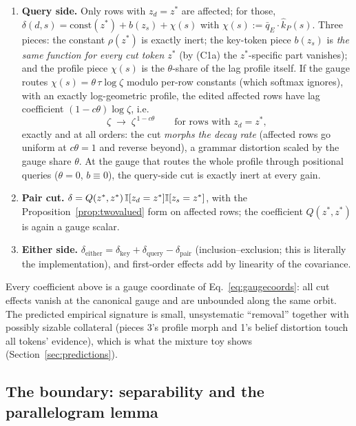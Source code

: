 \documentclass{article}
\begin{document}
\begin{theorem}
\begin{enumerate}
    \item \textbf{Query side.} Only rows with $z_d = z^*$ are affected; for those, $\delta(d,s) = \mathrm{const}(z^*) + b(z_s) + \chi(s)$ with $\chi(s) := \bar q_E\cdot\hat k_P(s)$. Three pieces: the constant $\rho(z^*)$ is exactly inert; the key-token piece $b(z_s)$ is \emph{the same function for every cut token $z^*$} (by (C1a) the $z^*$-specific part vanishes); and the profile piece $\chi(s)$ is the $\theta$-share of the lag profile itself. If the gauge routes $\chi(s) = \theta\,\tau\log\zeta$ modulo per-row constants (which softmax ignores), with an exactly log-geometric profile, the edited affected rows have lag coefficient $(1 - c\theta)\log\zeta$, i.e.
    \begin{equation}\label{eq:morph}
        \zeta \;\longrightarrow\; \zeta^{\,1 - c\theta} \qquad \text{for rows with } z_d = z^* ,
    \end{equation}
    exactly and at all orders: the cut \emph{morphs the decay rate} (affected rows go uniform at $c\theta = 1$ and reverse beyond), a grammar distortion scaled by the gauge share $\theta$. At the gauge that routes the whole profile through positional queries ($\theta = 0$, $b \equiv 0$), the query-side cut is exactly inert at every gain.
    \item \textbf{Pair cut.} $\delta = Q(z^*, z^*)\,\mathbb{I}[z_d = z^*]\mathbb{I}[z_s = z^*]$, with the Proposition~\ref{prop:twovalued} form on affected rows; the coefficient $Q(z^*, z^*)$ is again a gauge scalar.
    \item \textbf{Either side.} $\delta_{\mathrm{either}} = \delta_{\mathrm{key}} + \delta_{\mathrm{query}} - \delta_{\mathrm{pair}}$ (inclusion--exclusion; this is literally the implementation), and first-order effects add by linearity of the covariance.
\end{enumerate}
Every coefficient above is a gauge coordinate of Eq.~\eqref{eq:gaugecoords}: all cut effects vanish at the canonical gauge and are unbounded along the same orbit. The predicted empirical signature is small, unsystematic ``removal'' together with possibly sizable collateral (pieces 3's profile morph and 1's belief distortion touch all tokens' evidence), which is what the mixture toy shows (Section~\ref{sec:predictions}).
\end{theorem}

\subsection{The boundary: separability and the parallelogram lemma}
\end{document}
